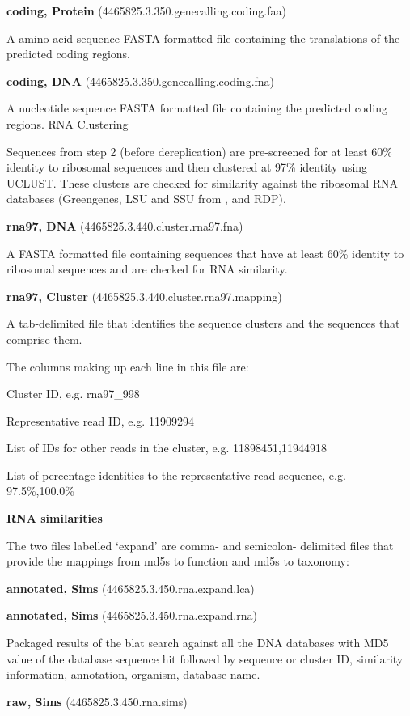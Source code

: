 \documentclass[12pt,fullpage]{report}
\begin{document}
\begin{mdframed}
\textbf{coding, Protein} (4465825.3.350.genecalling.coding.faa)

A amino-acid sequence FASTA formatted file containing the translations of the predicted coding regions.

\textbf{coding, DNA} (4465825.3.350.genecalling.coding.fna)

A nucleotide sequence FASTA formatted file containing the predicted coding regions.
RNA Clustering

Sequences from step 2 (before dereplication) are pre-screened for at least 60\% identity to ribosomal sequences and then clustered at 97\% identity using UCLUST. These clusters are checked for similarity against the ribosomal RNA databases (Greengenes\cite{GREENGENES}, LSU and SSU from \cite{SILVA}, and RDP\cite{RDP}).

\textbf{rna97, DNA} (4465825.3.440.cluster.rna97.fna)

A FASTA formatted file containing sequences that have at least 60\% identity to ribosomal sequences and are checked for RNA similarity.

\textbf{rna97, Cluster} (4465825.3.440.cluster.rna97.mapping)

A tab-delimited file that identifies the sequence clusters and the sequences that comprise them.

The columns making up each line in this file are:

    Cluster ID, e.g. rna97\_998

    Representative read ID, e.g. 11909294

    List of IDs for other reads in the cluster, e.g. 11898451,11944918

    List of percentage identities to the representative read sequence, e.g. 97.5\%,100.0\%

\textbf{RNA similarities}

The two files labelled ‘expand’ are comma- and semicolon- delimited files that provide the mappings from md5s to function and md5s to taxonomy:

\textbf{annotated, Sims} (4465825.3.450.rna.expand.lca)

\textbf{annotated, Sims} (4465825.3.450.rna.expand.rna)

Packaged results of the blat search against all the DNA databases with \gls{MD5} value of the database sequence hit followed by sequence or cluster ID, similarity information, annotation, organism, database name.

\textbf{raw, Sims} (4465825.3.450.rna.sims)


\end{mdframed}
\end{document}
